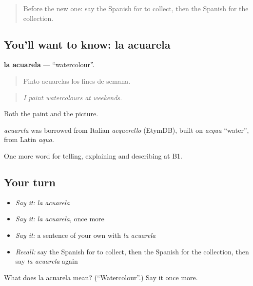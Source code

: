 \label{lesson:ES-C751-acuarela}



\begin{quote}
Before the new one: say the Spanish for to collect, then the Spanish for the collection.
\end{quote}

\subsection*{You'll want to know: la acuarela}
\textbf{la acuarela} — \textquotedblleft{}watercolour\textquotedblright{}.

\begin{quote}
Pinto acuarelas los fines de semana.
\end{quote}

\begin{quote}
\emph{I paint watercolours at weekends.}
\end{quote}

Both the paint and the picture.

\begin{cousinweb}
\emph{acuarela} was borrowed from Italian \emph{acquerello} (EtymDB), built on \emph{acqua} \textquotedblleft{}water\textquotedblright{}, from Latin \emph{aqua}.
\end{cousinweb}

\begin{grammarlens}[title={What you've built}]
One more word for telling, explaining and describing at B1.
\end{grammarlens}

\subsection*{Your turn}
\begin{itemize}
\raggedright
  \item \emph{Say it:} \emph{la acuarela}
  \item \emph{Say it:} \emph{la acuarela}, once more
  \item \emph{Say it:} a sentence of your own with \emph{la acuarela}
  \item \emph{Recall:} say the Spanish for to collect, then the Spanish for the collection, then say \emph{la acuarela} again
\end{itemize}

\begin{tcolorbox}[breakable,colback=teal!4,colframe=teal!35!black,title={Before you move on}]
What does la acuarela mean? (\textquotedblleft{}Watercolour\textquotedblright{}.) Say it once more.
\end{tcolorbox}
